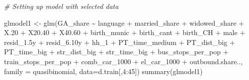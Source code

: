 \documentclass[
]{article}
\newenvironment{Shaded}{\begin{snugshade}}{\end{snugshade}}
\newcommand{\AttributeTok}[1]{\textcolor[rgb]{0.77,0.63,0.00}{#1}}
\newcommand{\CommentTok}[1]{\textcolor[rgb]{0.56,0.35,0.01}{\textit{#1}}}
\newcommand{\DecValTok}[1]{\textcolor[rgb]{0.00,0.00,0.81}{#1}}
\newcommand{\FloatTok}[1]{\textcolor[rgb]{0.00,0.00,0.81}{#1}}
\newcommand{\FunctionTok}[1]{\textcolor[rgb]{0.00,0.00,0.00}{#1}}
\newcommand{\NormalTok}[1]{#1}
\newcommand{\OtherTok}[1]{\textcolor[rgb]{0.56,0.35,0.01}{#1}}
\newcommand{\SpecialCharTok}[1]{\textcolor[rgb]{0.00,0.00,0.00}{#1}}
\begin{document}
\begin{Shaded}
\begin{Highlighting}[]
\CommentTok{\# Setting up model with selected data}

\NormalTok{glmodel1 }\OtherTok{\textless{}{-}} \FunctionTok{glm}\NormalTok{(GA\_share }\SpecialCharTok{\textasciitilde{}}\NormalTok{ language }\SpecialCharTok{+}\NormalTok{ married\_share }\SpecialCharTok{+}\NormalTok{ widowed\_share }\SpecialCharTok{+} 
\NormalTok{    X}\FloatTok{.20} \SpecialCharTok{+}\NormalTok{ X20}\FloatTok{.40} \SpecialCharTok{+}\NormalTok{ X40}\FloatTok{.60} \SpecialCharTok{+}\NormalTok{ birth\_munic }\SpecialCharTok{+}\NormalTok{ birth\_cant }\SpecialCharTok{+}\NormalTok{ birth\_CH }\SpecialCharTok{+} 
\NormalTok{    male }\SpecialCharTok{+}\NormalTok{ resid\_1}\FloatTok{.5}\NormalTok{y }\SpecialCharTok{+}\NormalTok{ resid\_6}\FloatTok{.10}\NormalTok{y }\SpecialCharTok{+}\NormalTok{ hh\_1 }\SpecialCharTok{+}\NormalTok{ PT\_time\_medium }\SpecialCharTok{+} 
\NormalTok{    PT\_dist\_big }\SpecialCharTok{+}\NormalTok{ PT\_time\_big }\SpecialCharTok{+}\NormalTok{ str\_dist\_big }\SpecialCharTok{+}\NormalTok{ str\_time\_big }\SpecialCharTok{+} 
\NormalTok{    bus\_stops\_per\_pop }\SpecialCharTok{+}\NormalTok{ train\_stops\_per\_pop }\SpecialCharTok{+}\NormalTok{ comb\_car\_1000 }\SpecialCharTok{+} 
\NormalTok{    el\_car\_1000 }\SpecialCharTok{+}\NormalTok{ outbound.share.., }\AttributeTok{family =}\NormalTok{ quasibinomial, }\AttributeTok{data=}\NormalTok{d.train[,}\DecValTok{4}\SpecialCharTok{:}\DecValTok{45}\NormalTok{])}
\FunctionTok{summary}\NormalTok{(glmodel1)}
\end{Highlighting}
\end{Shaded}
\end{document}
